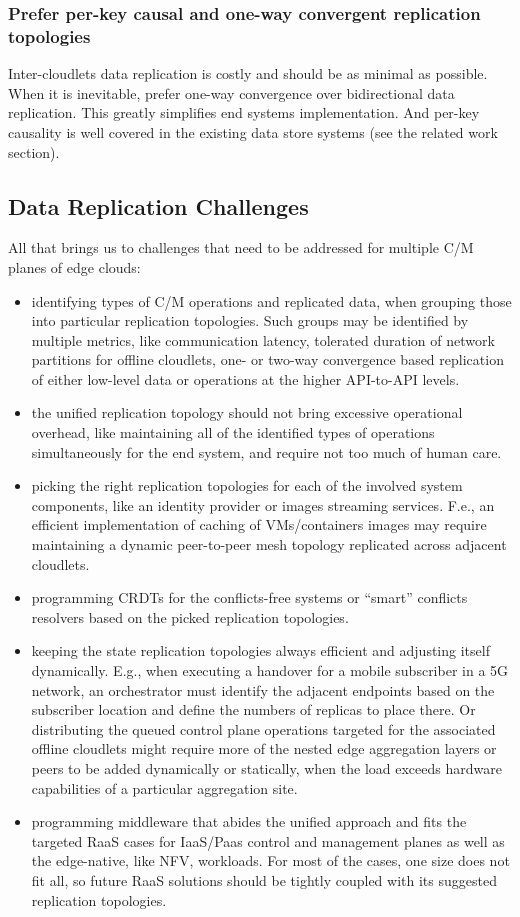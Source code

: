 \documentclass[conference]{IEEEtran}
\begin{document}
\subsubsection{Prefer per-key causal and one-way convergent replication topologies}
Inter-cloudlets data replication is costly and should be as minimal as possible.
When it is inevitable, prefer one-way convergence\cite{b2} over bidirectional
data replication. This greatly simplifies end systems implementation. And
per-key causality is well covered in the existing data store systems (see the
related work section).

\subsection{Data Replication Challenges}
All that brings us to challenges that need to be addressed for multiple C/M
planes of edge clouds:
\begin{itemize}
  \item identifying types of C/M operations and replicated
    data, when grouping those into particular replication topologies. Such
    groups may be identified by multiple metrics, like communication latency,
    tolerated duration of network partitions for offline cloudlets, one- or
    two-way convergence based replication of either low-level data or
    operations at the higher API-to-API levels.
  \item the unified replication topology should not bring excessive operational
    overhead, like maintaining all of the identified types of operations
    simultaneously for the end system, and require not too much of human care.
  \item picking the right replication topologies for each of the involved
    system components, like an identity provider or images streaming services.
    F.e., an efficient implementation of caching of VMs/containers images may
    require maintaining a dynamic peer-to-peer mesh topology replicated across
    adjacent cloudlets.
  \item programming CRDTs for the conflicts-free systems or ``smart'' conflicts
    resolvers based on the picked replication topologies.
  \item keeping the state replication topologies always efficient and adjusting
    itself dynamically. E.g., when executing a handover for a mobile subscriber
    in a 5G network, an orchestrator must identify the adjacent endpoints based
    on the subscriber location and define the numbers of replicas to place
    there. Or distributing the queued control plane operations targeted for the
    associated offline cloudlets might require more of the nested edge
    aggregation layers or peers to be added dynamically or statically, when the
    load exceeds hardware capabilities of a particular aggregation site.
  \item programming middleware that abides the unified approach and fits the
    targeted RaaS cases for IaaS/Paas control and management planes as well as
    the edge-native, like NFV, workloads. For most of the cases, one size
    does not fit all, so future RaaS solutions should be tightly coupled with
    its suggested replication topologies.
\end{itemize}
\end{document}
